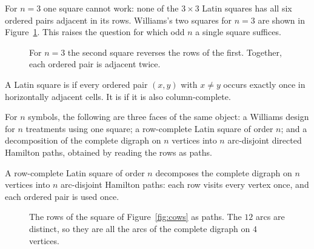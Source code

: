 For $n=3$ one square cannot work: none of the $3\times3$ Latin squares has all six ordered pairs adjacent in its rows. Williams's two squares for $n=3$ are shown in Figure~\ref{fig:williams-three}. This raises the question for which odd $n$ a single square suffices.

\begin{figure}[ht]
\centering

\caption{For $n=3$ the second square reverses the rows of the first. Together, each ordered pair is adjacent twice.}
\label{fig:williams-three}
\end{figure}


\begin{definition}\label{def:row-complete}
A Latin square is  if every ordered pair $(x,y)$ with $x\neq y$ occurs exactly once in horizontally adjacent cells. It is  if it is also column-complete.
\end{definition}

For $n$ symbols, the following are three faces of the same object: a Williams design for $n$ treatments using one square; a row-complete Latin square of order $n$; and a decomposition of the complete digraph on $n$ vertices into $n$ arc-disjoint directed Hamilton paths, obtained by reading the rows as paths.

\begin{fact}\label{fact:row-complete}
A row-complete Latin square of order $n$ decomposes the complete digraph on $n$ vertices into $n$ arc-disjoint Hamilton paths: each row visits every vertex once, and each ordered pair is used once.
\end{fact}

\begin{figure}[ht]
\centering

\caption{The rows of the square of Figure~\ref{fig:cows} as paths. The $12$ arcs are distinct, so they are all the arcs of the complete digraph on $4$ vertices.}
\label{fig:ham-paths}
\end{figure}
